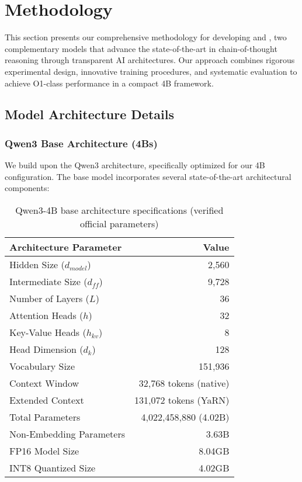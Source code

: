 \section{Methodology}
\label{sec:methodology}

This section presents our comprehensive methodology for developing \supra{} and \zennano{}, two complementary models that advance the state-of-the-art in chain-of-thought reasoning through transparent AI architectures. Our approach combines rigorous experimental design, innovative training procedures, and systematic evaluation to achieve O1-class performance in a compact 4B framework.

\subsection{Model Architecture Details}

\subsubsection{Qwen3 Base Architecture (4Bs)}
We build upon the Qwen3 architecture, specifically optimized for our 4B configuration. The base model incorporates several state-of-the-art architectural components:

\begin{table}[H]
\centering
\begin{tabular}{lr}
\toprule
Architecture Parameter & Value \\
\midrule
Hidden Size ($d_{model}$) & 2,560 \\
Intermediate Size ($d_{ff}$) & 9,728 \\
Number of Layers ($L$) & 36 \\
Attention Heads ($h$) & 32 \\
Key-Value Heads ($h_{kv}$) & 8 \\
Head Dimension ($d_k$) & 128 \\
Vocabulary Size & 151,936 \\
Context Window & 32,768 tokens (native) \\
Extended Context & 131,072 tokens (YaRN) \\
Total Parameters & 4,022,458,880 (4.02B) \\
Non-Embedding Parameters & 3.63B \\
FP16 Model Size & 8.04GB \\
INT8 Quantized Size & 4.02GB \\
\bottomrule
\end{tabular}
\caption{Qwen3-4B base architecture specifications (verified official parameters)}
\label{tab:qwen3-architecture}
\end{table}

